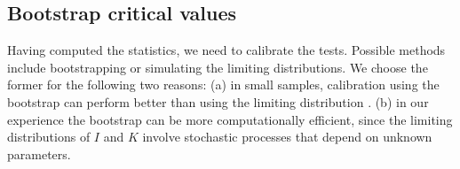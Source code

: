 \subsection{Bootstrap critical values%
} \label{sec:boot_compu}  

Having computed the statistics, we need to calibrate the tests. Possible methods include bootstrapping or simulating the limiting distributions. We choose the
former for the following two reasons: (a) in small samples, calibration using the bootstrap can perform better than using the limiting distribution %
\citep[][]{HV:1996}. %
(b) %
in our experience the bootstrap can be more computationally efficient, since the limiting distributions of $I$ and $K$ involve stochastic processes that depend on unknown parameters.

